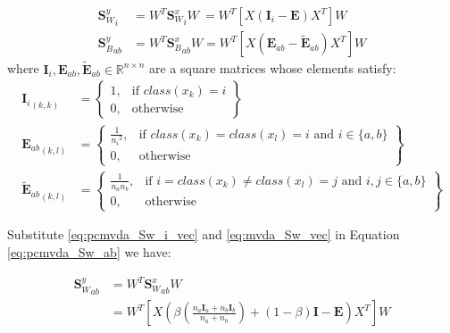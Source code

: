         \begin{align}
            {\boldsymbol{S}_W^y}_{i}  &= W^T {\boldsymbol{S}_W^x}_{i} W \ = W^T\left[X\left(\boldsymbol{I}_{i} - \boldsymbol{E}\right)X^T\right]W \label{eq:pcmvda_Sw_i_vec} \\
            {\boldsymbol{S}_B^y}_{ab} &= W^T {\boldsymbol{S}_B^x}_{ab} W = W^T\left[X\left(\boldsymbol{E}_{ab} - \boldsymbol{\tilde{E}}_{ab}\right)X^T\right]W \label{eq:pcmvda_Sb_ab_vec}
        \end{align}
        where $\boldsymbol{I}_{i}, \boldsymbol{E}_{ab}, \boldsymbol{\tilde{E}}_{ab} \in \mathbb{R}^{n\times n}$ are a square matrices whose elements satisfy:
        \begin{align}
            {\boldsymbol{I}_{i}}_{(k,k)} &= \left\{\begin{array}{lr}
                1, & \text{if } class(x_k) = i \\
                0, & \text{otherwise}
                \end{array}\right\} \\
            {\boldsymbol{E}_{ab}}_{(k,l)} &= \left\{\begin{array}{lr}
                \frac{1}{{n_i}^2}, & \text{if } class(x_k) = class(x_l) = i \text{ and } i \in \{a, b\} \\
                0, & \text{otherwise}
                \end{array}\right\} \\
            {\boldsymbol{\tilde{E}}_{ab}}_{(k,l)} &= \left\{\begin{array}{lr}
                \frac{1}{n_a n_b}, & \text{if } i = class(x_k) \neq class(x_l) = j \text{ and } i,j \in \{a, b\} \\
                0, & \text{otherwise}
                \end{array}\right\}
        \end{align}

        Substitute \eqref{eq:pcmvda_Sw_i_vec} and \eqref{eq:mvda_Sw_vec} in Equation \eqref{eq:pcmvda_Sw_ab} we have:

        \begin{equation}
            \begin{split}
                {\boldsymbol{S}_W^y}_{ab} &= W^T{\boldsymbol{S}_W^x}_{ab}W \\
                &= W^T\left[X\left(\beta\left(\frac{n_a\boldsymbol{I}_a+n_b\boldsymbol{I}_b}{n_a+n_b}\right) + \left(1-\beta\right)\boldsymbol{I} - \boldsymbol{E}\right)X^T\right]W
            \end{split}
            \label{eq:pcmvda_Sw_ab_vec}
        \end{equation}

